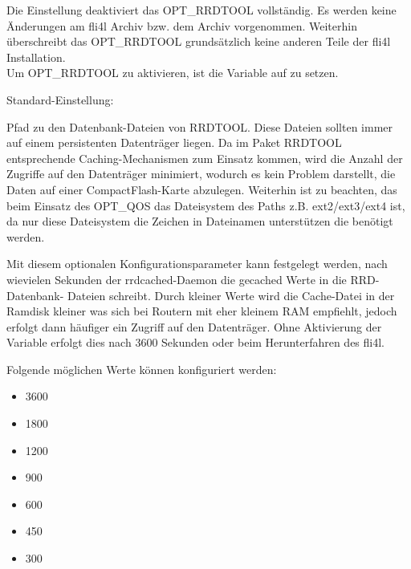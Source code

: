 \begin{description}


  Die Einstellung  deaktiviert das OPT\_RRDTOOL vollständig. Es werden
  keine Änderungen am fli4l Archiv  bzw. dem Archiv 
  vorgenommen. Weiterhin überschreibt das OPT\_RRDTOOL grundsätzlich keine anderen
  Teile der fli4l Installation.\\
  Um OPT\_RRDTOOL zu aktivieren, ist die Variable  auf 
   zu setzen.
  

  Standard-Einstellung: 
  
  Pfad zu den Datenbank-Dateien von RRDTOOL. Diese Dateien sollten immer auf 
  einem persistenten Datenträger liegen. Da im Paket RRDTOOL entsprechende 
  Caching-Mechanismen zum Einsatz kommen, wird die Anzahl der Zugriffe auf den 
  Datenträger minimiert, wodurch es kein Problem darstellt, die Daten auf einer 
  CompactFlash-Karte abzulegen.
  Weiterhin ist zu beachten, das beim Einsatz des OPT\_QOS das Dateisystem des 
  Paths z.B. ext2/ext3/ext4 ist, da nur diese Dateisystem die Zeichen in Dateinamen
  unterstützen die benötigt werden.


  Mit diesem optionalen Konfigurationsparameter kann festgelegt werden, nach 
  wievielen Sekunden der rrdcached-Daemon die gecached Werte in die RRD-Datenbank-
  Dateien schreibt. Durch kleiner Werte wird die Cache-Datei in der Ramdisk kleiner
  was sich bei Routern mit eher kleinem RAM empfiehlt, jedoch erfolgt dann häufiger
  ein Zugriff auf den Datenträger.
  Ohne Aktivierung der Variable erfolgt dies nach 3600 Sekunden oder beim
  Herunterfahren des fli4l.

  Folgende möglichen Werte können konfiguriert werden:
  \begin{itemize}
    \item 3600
    \item 1800
    \item 1200
    \item 900
    \item 600
    \item 450
    \item 300
  \end{itemize}



\end{description}
